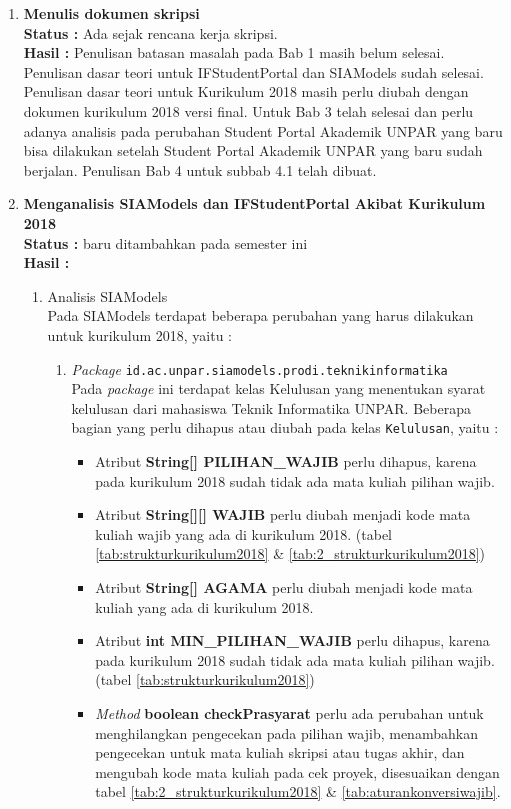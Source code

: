 \documentclass[a4paper,twoside]{article}
\begin{document}
\begin{enumerate}
		\item \textbf{Menulis dokumen skripsi}\\
		{\bf Status :} Ada sejak rencana kerja skripsi.\\
		{\bf Hasil :} Penulisan batasan masalah pada Bab 1 masih belum selesai. Penulisan dasar teori untuk IFStudentPortal dan SIAModels sudah selesai. Penulisan dasar teori untuk Kurikulum 2018 masih perlu diubah dengan dokumen kurikulum 2018 versi final. Untuk Bab 3 telah selesai dan perlu adanya analisis pada perubahan Student Portal Akademik UNPAR yang baru bisa dilakukan setelah Student Portal Akademik UNPAR yang baru sudah berjalan. Penulisan Bab 4 untuk subbab 4.1 telah dibuat.
		
		\item \textbf{Menganalisis SIAModels dan IFStudentPortal Akibat Kurikulum 2018}\\
		{\bf Status :} baru ditambahkan pada semester ini\\
		{\bf Hasil :} 
		\begin{enumerate}
			\item Analisis SIAModels \\
			Pada SIAModels terdapat beberapa perubahan yang harus dilakukan untuk kurikulum 2018, yaitu :
			\begin{enumerate}
				\item \textit{Package} \texttt{id.ac.unpar.siamodels.prodi.teknikinformatika}\\
				Pada \textit{package} ini terdapat kelas Kelulusan yang menentukan syarat kelulusan dari mahasiswa Teknik Informatika UNPAR. Beberapa bagian yang perlu dihapus atau diubah pada kelas \texttt{Kelulusan}, yaitu :
				\begin{itemize}
					\item Atribut \textbf{String[] PILIHAN\_WAJIB} perlu dihapus, karena pada kurikulum 2018 sudah tidak ada mata kuliah pilihan wajib.
					\item Atribut \textbf{String[][] WAJIB} perlu diubah menjadi kode mata kuliah wajib yang ada di kurikulum 2018. (tabel \ref{tab:strukturkurikulum2018} \& \ref{tab:2_strukturkurikulum2018})
					\item Atribut \textbf{String[] AGAMA} perlu diubah menjadi kode mata kuliah yang ada di kurikulum 2018.
					\item Atribut \textbf{int MIN\_PILIHAN\_WAJIB} perlu dihapus, karena pada kurikulum 2018 sudah tidak ada mata kuliah pilihan wajib. (tabel \ref{tab:strukturkurikulum2018})
					\item \textit{Method} \textbf{boolean checkPrasyarat} perlu ada perubahan untuk menghilangkan pengecekan pada pilihan wajib, menambahkan pengecekan untuk mata kuliah skripsi atau tugas akhir, dan mengubah kode mata kuliah pada cek proyek, disesuaikan dengan tabel \ref{tab:2_strukturkurikulum2018} \& \ref{tab:aturankonversiwajib}.
				\end{itemize}
					

\end{enumerate}
\end{enumerate}
\end{enumerate}
\end{document}
